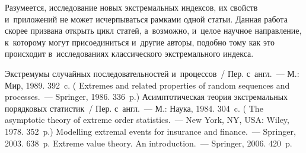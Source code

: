 \begin{multicols}{2}
Разумеется, исследование новых экстремальных индексов, их свойств
и~приложений не может
исчерпываться рамками одной статьи. Данная работа скорее призвана открыть
цикл статей,
а~возможно, и~целое научное направление, к~которому могут присоединиться
и~другие авторы,
подобно тому как это происходит в~исследованиях классического экстремального индекса.

\vspace*{-9pt}

{\small\frenchspacing
 {%
 \begin{thebibliography}{99}
 
 \vspace*{-2pt}
 
 
 Экстремумы случайных
последовательностей и~процессов~/ Пер. с~англ.~--- М.: Мир, 1989.
392~c. ( Extremes and
related properties of random sequences and processes.~--- Springer,
1986. 336~p.)
 Асимптотическая теория экстремальных порядковых
статистик~/ Пер. с~англ.~--- М.: Наука, 1984. 304~c. (
The asymptotic theory of extreme order statistics.~--- New York, NY, USA:
Wiley, 1978. 352~p.)
 Modelling extremal
events for insurance and finance.~--- Springer, 2003. 638~p.
 Extreme value theory. An introduction.~---
Springer, 2006. 420~p.

\pagebreak


\end{thebibliography}}}
\end{multicols}
